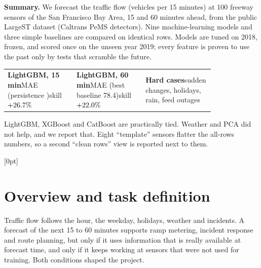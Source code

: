 \documentclass[11pt,a4paper]{article}
\begin{document}
\vspace{6pt}
\begin{keybox}
\textbf{Summary.} We forecast the traffic flow (vehicles per 15 minutes) at 100 freeway sensors of the San Francisco Bay Area,
15 and 60 minutes ahead, from the public LargeST dataset (Caltrans PeMS detectors). Nine machine-learning models and three
simple baselines are compared on identical rows. Models are tuned on 2018, frozen, and scored once on the unseen year 2019;
every feature is proven to use the past only by tests that scramble the future.

\medskip
\begin{tabular}{@{}p{0.27\linewidth}p{0.27\linewidth}p{0.27\linewidth}@{}}
\textbf{LightGBM, 15 min}\newline MAE \lgbmMAEFifteen{} (persistence \persMAEFifteen{})\newline skill $+26.7\%$ &
\textbf{LightGBM, 60 min}\newline MAE \lgbmMAESixty{} (best baseline 78.4)\newline skill $+22.0\%$ &
\textbf{Hard cases}\newline sudden changes, holidays, rain, feed outages
\end{tabular}

\medskip
LightGBM, XGBoost and CatBoost are practically tied. Weather and PCA did not help, and we report that. Eight ``template''
sensors flatter the all-rows numbers, so a second ``clean rows'' view is reported next to them.
\end{keybox}

\setcounter{tocdepth}{1}
[0pt]{\addvspace{2pt}\small}{\contentslabel{1.6em}}{\hspace*{-1.6em}}{\contentspage}
\small\tableofcontents
\newpage

\section{Overview and task definition}
Traffic flow follows the hour, the weekday, holidays, weather and incidents. A forecast of the next 15 to 60 minutes supports
ramp metering, incident response and route planning, but only if it uses information that is really available at forecast time,
and only if it keeps working at sensors that were not used for training. Both conditions shaped the project.
\end{document}
